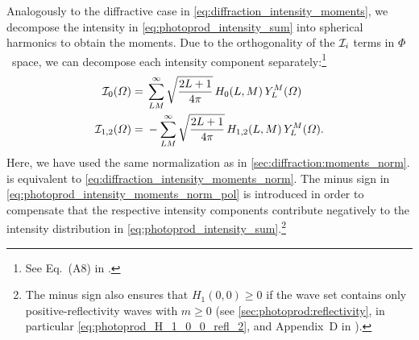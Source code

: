 Analogously to the diffractive case in
\cref{eq:diffraction_intensity_moments}, we decompose the intensity in
\cref{eq:photoprod_intensity_sum} into spherical harmonics to obtain
the moments.  Due to the orthogonality of the $\mathcal{I}_i$ terms in
$\Phi$~space, we can decompose each intensity component
separately:\footnote{See Eq.~(A8) in .}
\begin{align}
  \label{eq:photoprod_intensity_moments_norm_unpol}
  \mathcal{I}_0(\Omega)
  ={}& \sum_{L M}^\infty \sqrt{\frac{2 L + 1}{4 \pi}}\, H_0(L, M)\, Y_L^M(\Omega)
  \\
  \label{eq:photoprod_intensity_moments_norm_pol}
  \mathcal{I}_{1, 2}(\Omega)
  ={}& -\sum_{L M}^\infty \sqrt{\frac{2 L + 1}{4 \pi}}\, H_{1, 2}(L, M)\, Y_L^M(\Omega).
\end{align}
Here, we have used the same normalization as in
\cref{sec:diffraction:moments_norm}.
 is equivalent to
\cref{eq:diffraction_intensity_moments_norm}.  The minus sign in
\cref{eq:photoprod_intensity_moments_norm_pol} is introduced in order
to compensate that the respective intensity components contribute
negatively to the intensity distribution in
\cref{eq:photoprod_intensity_sum}.\footnote{\label{fn:photoprod_intensity_sign}The
minus sign also ensures that $H_1(0, 0) \geq 0$ if the wave set
contains only positive-reflectivity waves with $m \geq 0$ (see
\cref{sec:photoprod:reflectivity}, in particular
\cref{eq:photoprod_H_1_0_0_refl_2}, and Appendix~D in
).}

